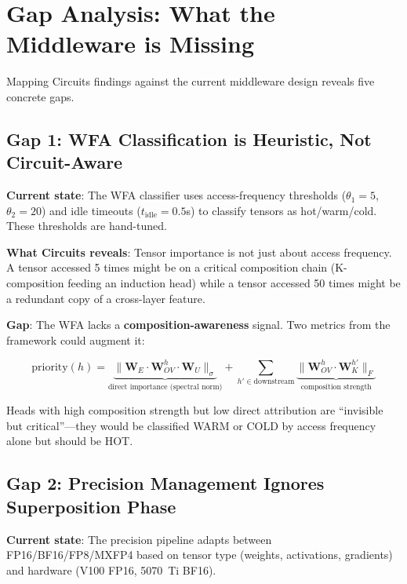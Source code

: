 \documentclass[11pt,letterpaper]{article}
\begin{document}
\section{Gap Analysis: What the Middleware is Missing}
\label{sec:gaps}

Mapping Circuits findings against the current middleware design reveals five concrete gaps.

\subsection{Gap 1: WFA Classification is Heuristic, Not Circuit-Aware}

\textbf{Current state}: The WFA classifier uses access-frequency thresholds ($\theta_1 = 5$, $\theta_2 = 20$) and idle timeouts ($t_{\text{idle}} = 0.5$s) to classify tensors as hot/warm/cold. These thresholds are hand-tuned.

\textbf{What Circuits reveals}: Tensor importance is not just about access frequency. A tensor accessed 5 times might be on a critical composition chain (K-composition feeding an induction head) while a tensor accessed 50 times might be a redundant copy of a cross-layer feature.

\textbf{Gap}: The WFA lacks a \textbf{composition-awareness} signal. Two metrics from the framework could augment it:

\begin{equation}
    \text{priority}(h) = \underbrace{\|\mathbf{W}_E \cdot \mathbf{W}_{OV}^h \cdot \mathbf{W}_U\|_\sigma}_{\text{direct importance (spectral norm)}} + \sum_{h' \in \text{downstream}} \underbrace{\|\mathbf{W}_{OV}^h \cdot \mathbf{W}_K^{h'}\|_F}_{\text{composition strength}}
\end{equation}

Heads with high composition strength but low direct attribution are ``invisible but critical''---they would be classified WARM or COLD by access frequency alone but should be HOT.

\subsection{Gap 2: Precision Management Ignores Superposition Phase}

\textbf{Current state}: The precision pipeline adapts between FP16/BF16/FP8/MXFP4 based on tensor type (weights, activations, gradients) and hardware (V100 FP16, 5070~Ti BF16).
\end{document}
